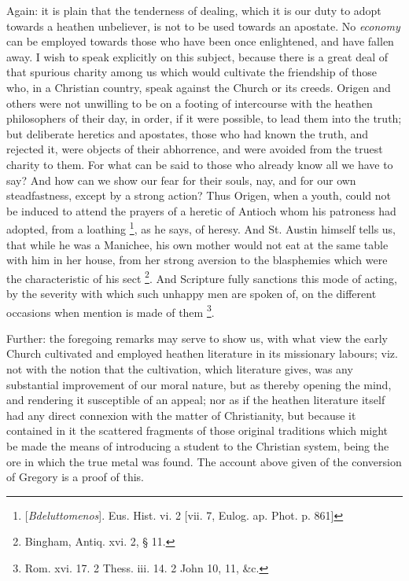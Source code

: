 Again: it is plain that the tenderness of dealing, which it is our
duty to adopt towards a heathen unbeliever, is not to be used towards
an apostate. No \emph{economy} can be employed towards those who have been
once enlightened, and have fallen away. I wish to speak explicitly on
this subject, because there is a great deal of that spurious charity
among us which would cultivate the friendship of those who, in a
Christian country, speak against the Church or its creeds. Origen and
others were not unwilling to be on a footing of intercourse with the
heathen philosophers of their day, in order, if it were possible, to
lead them into the truth; but deliberate heretics and apostates, those who had known the truth, and rejected it, were objects of their
abhorrence, and were avoided from the truest charity to them. For what
can be said to those who already know all we have to say? And how can
we show our fear for their souls, nay, and for our own steadfastness,
except by a strong action? Thus Origen, when a youth, could not be
induced to attend the prayers of a heretic of Antioch whom his
patroness had adopted, from a loathing \footnote{[\emph{Bdeluttomenos}]. Eus. Hist. vi. 2
[vii. 7, Eulog. ap. Phot. p. 861]}, as he says, of heresy. And St. Austin himself tells us, that
while he was a Manichee, his own mother would not eat at the same
table with him in her house, from her strong aversion to the
blasphemies which were the characteristic of his sect \footnote{Bingham, Antiq. xvi. 2, § 11.}. And Scripture fully sanctions this mode of acting, by the
severity with which such unhappy men are spoken of, on the different
occasions when mention is made of them \footnote{Rom. xvi. 17. 2 Thess. iii. 14. 2 John 10,
11, \&c.}.

Further: the foregoing remarks may serve to show us, with what view
the early Church cultivated and employed heathen literature in its
missionary labours; viz. not with the notion that the cultivation,
which literature gives, was any substantial improvement of our moral
nature, but as thereby opening the mind, and rendering it susceptible
of an appeal; nor as if the heathen literature itself had any direct
connexion with the matter of Christianity, but because it contained in
it the scattered fragments of those original traditions which might be
made the means of introducing a student to the Christian system, being
the ore in which the true metal was found. The account above given of
the conversion of Gregory is a proof of this.

